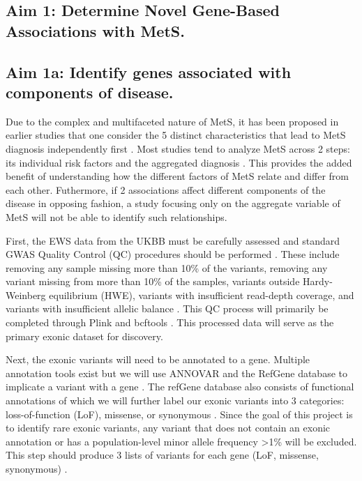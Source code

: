 \documentclass[11pt]{article}
\begin{document}
\subsection*{Aim 1: Determine Novel Gene-Based Associations with MetS.}

\subsection*{Aim 1a: Identify genes associated with components of disease.} 

\noindent {}

Due to the complex and multifaceted nature of MetS, it has been proposed in earlier studies that one consider the 5 distinct characteristics that lead to MetS diagnosis independently first \cite{pmid31589552,Lee2018}. Most studies tend to analyze MetS across 2 steps: its individual risk factors and the aggregated diagnosis \cite{pmid31589552,Lee2018}. This provides the added benefit of understanding how the different factors of MetS relate and differ from each other. Futhermore, if 2 associations affect different components of the disease in opposing fashion, a study focusing only on the aggregate variable of MetS will not be able to identify such relationships.

\noindent {}

First, the EWS data from the UKBB must be carefully assessed and standard GWAS Quality Control (QC) procedures should be performed \cite{Szustakowski2021-sn}. These include removing any sample missing more than 10\% of the variants, removing any variant missing from more than 10\% of the samples, variants outside Hardy-Weinberg equilibrium (HWE), variants with insufficient read-depth coverage, and variants with insufficient allelic balance \cite{Szustakowski2021-sn}. This QC process will primarily be completed through Plink and bcftools \cite{Purcell2007-at,Danecek2021-tu}. This processed data will serve as the primary exonic dataset for discovery.

Next, the exonic variants will need to be annotated to a gene. Multiple annotation tools exist but we will use ANNOVAR and the RefGene database to implicate a variant with a gene \cite{Zhou2022,Wang2010-rw}. The refGene database also consists of functional annotations of which we will further label our exonic variants into 3 categories: loss-of-function (LoF), missense, or synonymous \cite{Zhou2022,Wang2010-rw}. Since the goal of this project is to identify rare exonic variants, any variant that does not contain an exonic annotation or has a population-level minor allele frequency >1\% will be excluded. This step should produce 3 lists of variants for each gene (LoF, missense, synonymous) \cite{Zhou2022,Wang2010-rw}.
\end{document}
